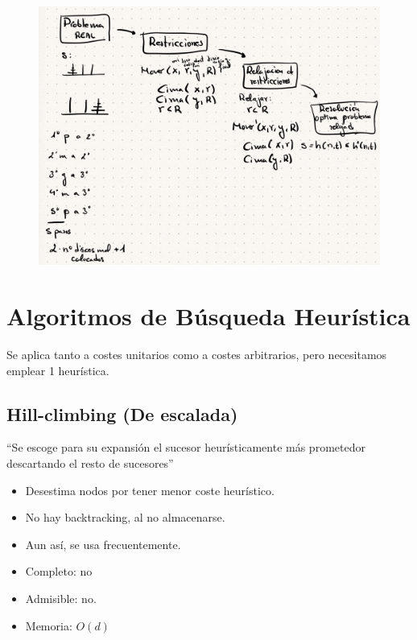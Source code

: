 \documentclass[12pt, twoside, openright]{report} %
\begin{document}
	\begin{figure}[H]
		{\includegraphics[scale=.22]{Untitled 53.png}}
	\end{figure}
\pagebreak
\section{Algoritmos de Búsqueda Heurística}

  Se aplica tanto a costes unitarios como a costes arbitrarios, pero
  necesitamos emplear 1 heurística.

\subsection{Hill-climbing (De escalada)}

  ``Se escoge para su expansión el sucesor heurísticamente más
  prometedor descartando el resto de sucesores''

  \begin{itemize}

  \item
    Desestima nodos por tener menor coste heurístico.
  \item
    No hay backtracking, al no almacenarse.
  \item
    Aun así, se usa frecuentemente.
  \item
    Completo: no
  \item
    Admisible: no.
  \item
    Memoria: \(O(d)\)
  \end{itemize}
\end{document}
